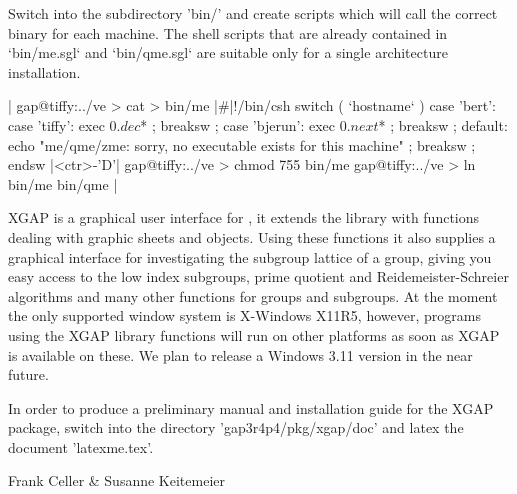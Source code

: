 Switch into the  subdirectory 'bin/' and  create scripts which will call
the correct binary for each machine.  The shell scripts that are already
contained in `bin/me.sgl` and `bin/qme.sgl` are suitable only for a single
architecture installation.

|    gap@tiffy:../ve > cat > bin/me
    |\#|!/bin/csh
    switch ( `hostname` )
      case 'bert':
      case 'tiffy':
        exec $0.dec $* ;
        breaksw ;
      case 'bjerun':
        exec $0.next $* ;
        breaksw ;
      default:
        echo "me/qme/zme: sorry, no executable exists for this machine" ;
        breaksw ;
    endsw
    |<ctr>-'D'|
    gap@tiffy:../ve > chmod 755 bin/me
    gap@tiffy:../ve > ln bin/me bin/qme |

\def\XGAP{{\sf XGAP}}

{\XGAP} is  a graphical  user interface  for  {\GAP}, it  extends  the
{\GAP} library with functions dealing with graphic sheets and objects.
Using these  functions  it also   supplies a graphical  interface  for
investigating the subgroup lattice of  a group, giving you easy access
to  the low index  subgroups, prime quotient and Reidemeister-Schreier
algorithms and many  other {\GAP} functions  for groups and subgroups.
At  the  moment the only supported  window  system is X-Windows X11R5,
however,  programs using the  {\XGAP}  library  functions will run  on
other platforms as soon as {\XGAP} is available  on these.  We plan to
release a Windows 3.11 version in the near future.
 
In order to  produce a preliminary  manual and installation guide  for
the {\XGAP} package, switch into the directory 'gap3r4p4/pkg/xgap/doc'
and latex the document 'latexme.tex'.
 
\centerline{Frank Celler \& Susanne Keitemeier}

